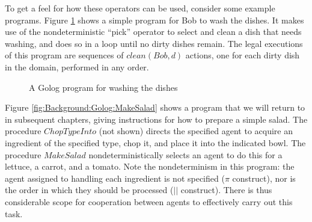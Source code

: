 To get a feel for how these operators can be used, consider some example
programs. Figure \ref{fig:Background:Golog:Washing-Dishes} shows
a simple program for Bob to wash the dishes. It makes use of the nondeterministic
{}``pick'' operator to select and clean a dish that needs washing,
and does so in a loop until no dirty dishes remain. The legal executions
of this program are sequences of $clean(Bob,d)$ actions, one for
each dirty dish in the domain, performed in any order.

%
\begin{figure}
\begin{centering}
\par\end{centering}

\caption{A Golog program for washing the dishes\label{fig:Background:Golog:Washing-Dishes}}

\end{figure}


Figure \ref{fig:Background:Golog:MakeSalad} shows a program that
we will return to in subsequent chapters, giving instructions for
how to prepare a simple salad. The procedure $ChopTypeInto$ (not
shown) directs the specified agent to acquire an ingredient of the
specified type, chop it, and place it into the indicated bowl. The
procedure $MakeSalad$ nondeterministically selects an agent to do
this for a lettuce, a carrot, and a tomato. Note the nondeterminism
in this program: the agent assigned to handling each ingredient is
not specified ($\pi$ construct), nor is the order in which they should
be processed ($||$ construct). There is thus considerable scope for
cooperation between agents to effectively carry out this task.

